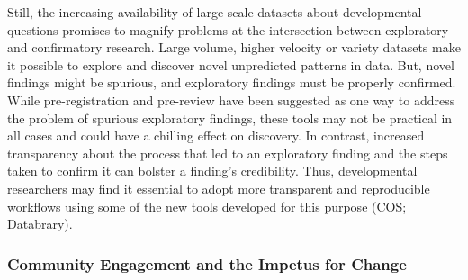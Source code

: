\documentclass[letterpaper,man,apacite]{apa6}
\begin{document}
Still, the increasing availability of large-scale datasets about developmental questions promises to magnify problems at the intersection between exploratory and confirmatory research.
Large volume, higher velocity or variety datasets make it possible to explore and discover novel unpredicted patterns in data.
But, novel findings might be spurious, and exploratory findings must be properly confirmed.
While pre-registration and pre-review have been suggested as one way to address the problem of spurious exploratory findings, these tools may not be practical in all cases and could have a chilling effect on discovery.
In contrast, increased transparency about the process that led to an exploratory finding and the steps taken to confirm it can bolster a finding's credibility.
Thus, developmental researchers may find it essential to adopt more transparent and reproducible workflows using some of the new tools developed for this purpose (COS; Databrary).

\subsubsection{Community Engagement and the Impetus for Change}
\end{document}
